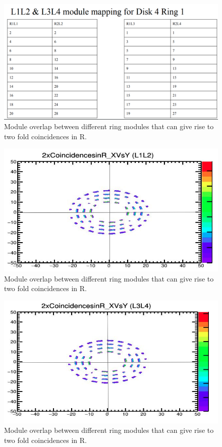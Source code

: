 \begin{figure}[!htp]
\centering
\includegraphics[width=1\textwidth]{ashish_thesis/onetoonemoduleoverlap2xinR_table.png}
\caption{%
   Module overlap between different ring modules that can give rise to two fold coincidences in R.
}
\label{fig:cluster_ring}
\end{figure}



\begin{figure}[!htp]
\centering
\includegraphics[width=1\textwidth]{ashish_thesis/l1l2_2xinr.png}
\caption{%
   Module overlap between different ring modules that can give rise to two fold coincidences in R.
}
\label{fig:cluster_ring}
\end{figure}

\begin{figure}[!htp]
\centering
\includegraphics[width=1\textwidth]{ashish_thesis/l3l4_2xinr.png}
\caption{%
   Module overlap between different ring modules that can give rise to two fold coincidences in R.
}
\label{fig:cluster_ring}
\end{figure}



